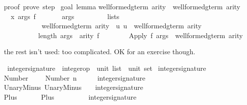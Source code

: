 \begin{isabellebody}
\begin{isamarkuptext}
proof\ {\isacharparenleft}prove{\isacharparenright}{\isacharcolon}\ step\ {}\isanewline
\isanewline
goal\ {\isacharparenleft}lemma{\isacharparenright}{\isacharcolon}\isanewline
well{\isacharunderscore}formed{\isacharunderscore}gterm{\isacharprime}\ arity\ {\isasymsubseteq}\ well{\isacharunderscore}formed{\isacharunderscore}gterm\ arity\isanewline
\ {}{\isachardot}\ {\isasymAnd}x\ args\ f{\isachardot}\isanewline
\ \ \ \ \ \ \ {\isasymlbrakk}args\isanewline
\ \ \ \ \ \ \ \ {\isasymin}\ lists\isanewline
\ \ \ \ \ \ \ \ \ \ \ {\isacharparenleft}well{\isacharunderscore}formed{\isacharunderscore}gterm{\isacharprime}\ arity\ {\isasyminter}\ {\isacharbraceleft}u{\isachardot}\ u\ {\isasymin}\ well{\isacharunderscore}formed{\isacharunderscore}gterm\ arity{\isacharbraceright}{\isacharparenright}{\isacharsemicolon}\isanewline
\ \ \ \ \ \ \ \ \ \ length\ args\ {\isacharequal}\ arity\ f{\isasymrbrakk}\isanewline
\ \ \ \ \ \ \ {\isasymLongrightarrow}\ Apply\ f\ args\ {\isasymin}\ well{\isacharunderscore}formed{\isacharunderscore}gterm\ arity%
\end{isamarkuptext}%
%
\begin{isamarkuptext}%
the rest isn't used: too complicated.  OK for an exercise though.%
\end{isamarkuptext}%
\ integer{\isacharunderscore}signature\ {\isacharcolon}{\isacharcolon}\ {\isachardoublequote}{\isacharparenleft}integer{\isacharunderscore}op\ {\isacharasterisk}\ {\isacharparenleft}unit\ list\ {\isacharasterisk}\ unit{\isacharparenright}{\isacharparenright}\ set{\isachardoublequote}\isanewline
{}\ {\isachardoublequote}integer{\isacharunderscore}signature{\isachardoublequote}\isanewline
{}\isanewline
Number{\isacharcolon}\ \ \ \ \ {\isachardoublequote}{\isacharparenleft}Number\ n{\isacharcomma}\ \ \ {\isacharparenleft}{\isacharbrackleft}{\isacharbrackright}{\isacharcomma}\ {\isacharparenleft}{\isacharparenright}{\isacharparenright}{\isacharparenright}\ {\isasymin}\ integer{\isacharunderscore}signature{\isachardoublequote}\isanewline
UnaryMinus{\isacharcolon}\ {\isachardoublequote}{\isacharparenleft}UnaryMinus{\isacharcomma}\ {\isacharparenleft}{\isacharbrackleft}{\isacharparenleft}{\isacharparenright}{\isacharbrackright}{\isacharcomma}\ {\isacharparenleft}{\isacharparenright}{\isacharparenright}{\isacharparenright}\ {\isasymin}\ integer{\isacharunderscore}signature{\isachardoublequote}\isanewline
Plus{\isacharcolon}\ \ \ \ \ \ \ {\isachardoublequote}{\isacharparenleft}Plus{\isacharcomma}\ \ \ \ \ \ \ {\isacharparenleft}{\isacharbrackleft}{\isacharparenleft}{\isacharparenright}{\isacharcomma}{\isacharparenleft}{\isacharparenright}{\isacharbrackright}{\isacharcomma}\ {\isacharparenleft}{\isacharparenright}{\isacharparenright}{\isacharparenright}\ {\isasymin}\ integer{\isacharunderscore}signature{\isachardoublequote}\isanewline

\end{isabellebody}

